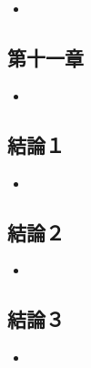 \begin{itemize}
\tightlist
\item
\end{itemize}

\subsection{第十一章}\label{ux7b2cux5341ux4e00ux7ae0}

\begin{itemize}
\tightlist
\item
\end{itemize}

\subsection{結論１}\label{ux7d50ux8ad6uxff11}

\begin{itemize}
\tightlist
\item
\end{itemize}

\subsection{結論２}\label{ux7d50ux8ad6uxff12}

\begin{itemize}
\tightlist
\item
\end{itemize}

\subsection{結論３}\label{ux7d50ux8ad6uxff13}

\begin{itemize}
\tightlist
\item
\end{itemize}
